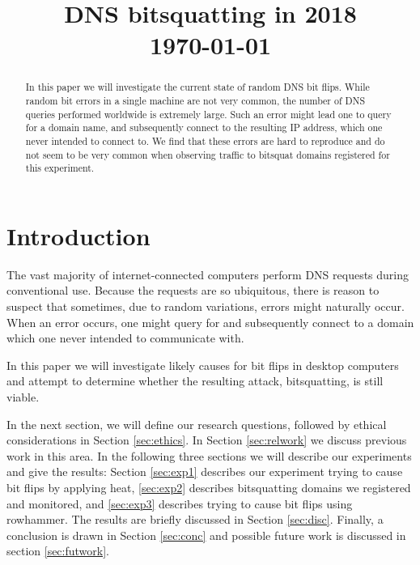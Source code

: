 \documentclass[conference]{IEEEtran}
\begin{document}
\title{DNS bitsquatting in 2018\\\vspace{5mm} \large  \today}
\author{
\and
{}
}
\maketitle
\thispagestyle{plain}
\pagestyle{plain}

\begin{abstract}

	In this paper we will investigate the current state of random DNS bit
	flips. While random bit errors in a single machine are not very common, the
	number of DNS queries performed worldwide is extremely large. Such an error
	might lead one to query for a domain name, and subsequently connect to the
	resulting IP address, which one never intended to connect to. We find that
	these errors are hard to reproduce and do not seem to be very common when
	observing traffic to bitsquat domains registered for this experiment.

\end{abstract}

\section{Introduction}

The vast majority of internet-connected computers perform DNS requests during
conventional use. Because the requests are so ubiquitous, there is reason to
suspect that sometimes, due to random variations, errors might naturally occur.
When an error occurs, one might query for and subsequently connect to a domain
which one never intended to communicate with.

In this paper we will investigate likely causes for bit flips in desktop
computers and attempt to determine whether the resulting attack, bitsquatting,
is still viable.

In the next section, we will define our research questions, followed by ethical
considerations in Section \ref{sec:ethics}. In Section \ref{sec:relwork} we
discuss previous work in this area. In the following three sections we will
describe our experiments and give the results: Section \ref{sec:exp1} describes
our experiment trying to cause bit flips by applying heat, \ref{sec:exp2}
describes bitsquatting domains we registered and monitored, and \ref{sec:exp3}
describes trying to cause bit flips using rowhammer. The results are briefly
discussed in Section \ref{sec:disc}. Finally, a conclusion is drawn in Section
\ref{sec:conc} and possible future work is discussed in section
\ref{sec:futwork}.
\end{document}
